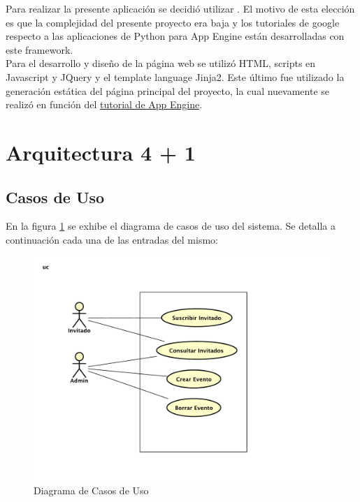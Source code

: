 \documentclass[a4paper,10pt]{article}
\begin{document}
        Para realizar la presente aplicación se decidió utilizar . El motivo de esta elección es que
        la complejidad del presente proyecto era baja y los tutoriales de google respecto a las aplicaciones de 
        Python para App Engine están desarrolladas con este framework. \\
        \indent Para el desarrollo y diseño de la página web se utilizó HTML, scripts en Javascript y JQuery 
        y el template language Jinja2. Este último fue utilizado la generación estática del página principal del 
        proyecto, la cual nuevamente se realizó en función del 
        \href{https://cloud.google.com/appengine/docs/python/gettingstartedpython27/introduction}{tutorial de App Engine}.
        

    \newpage
    \section{Arquitectura 4 + 1}
    \subsection{Casos de Uso}
        En la figura \ref{DiagCU} se exhibe el diagrama de casos de uso del sistema. Se detalla a continuación cada
        una de las entradas del mismo:

        \begin{figure}[!Hhtb]                                             
            \centering                                                   
            \includegraphics[width=15cm,origin=c]{Imagenes/Casos_De_Uso.pdf}        
            \caption{Diagrama de Casos de Uso} \label{DiagCU}
        \end{figure}
\end{document}
